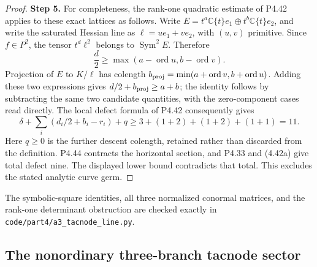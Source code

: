 \begin{proof}
\noindent\textbf{Step 5.} For completeness, the rank-one quadratic estimate of
P4.42 applies to these exact lattices as follows. Write
$E=t^a\mathbb C\{t\}e_1\oplus
t^b\mathbb C\{t\}e_2$, and write the saturated Hessian
line as $\ell=u e_1+v e_2$, with $(u,v)$ primitive.
Since $f\in P^2$, the tensor $t^d\ell^2$ belongs to
$\operatorname{Sym}^2E$. Therefore
\[
 \frac d2\ge\max(a-\operatorname{ord}u,
                         b-\operatorname{ord}v).
\]
Projection of $E$ to $K/\ell$ has colength
$b_{\rm proj}=\min(a+\operatorname{ord}v,
b+\operatorname{ord}u)$. Adding these two expressions
gives $d/2+b_{\rm proj}\ge a+b$; the identity follows
by subtracting the same two candidate quantities, with
the zero-component cases read directly. The local defect
formula of P4.42 consequently gives
\[
 \delta+\sum_i(d_i/2+b_i-r_i)+q
       \ge3+(1+2)+(1+2)+(1+1)=11.
\]
Here $q\ge0$ is the further descent colength, retained
rather than discarded from the definition. P4.44 contracts
the horizontal section, and P4.33 and (4.42a) give total
defect nine. The displayed lower bound contradicts that
total. This excludes the stated analytic curve germ.
\end{proof}

The symbolic-square identities, all three normalized
conormal matrices, and the rank-one determinant obstruction
are checked exactly in
\texttt{code/part4/a3\_tacnode\_line.py}.


\subsection{The nonordinary three-branch tacnode sector}

